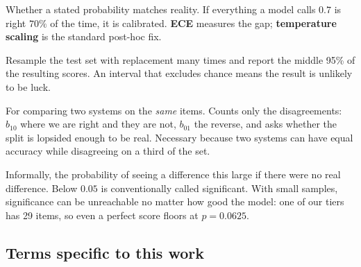 \begin{description}[leftmargin=0em,style=nextline,itemsep=0.3em]
\item[Calibration] Whether a stated probability matches reality. If
everything a model calls $0.7$ is right $70\%$ of the time, it is
calibrated. \textbf{ECE} measures the gap; \textbf{temperature scaling} is
the standard post-hoc fix.

\item[Bootstrap confidence interval] Resample the test set with
replacement many times and report the middle 95\% of the resulting scores.
An interval that excludes chance means the result is unlikely to be luck.

\item[McNemar test] For comparing two systems on the \emph{same} items.
Counts only the disagreements: $b_{10}$ where we are right and they are
not, $b_{01}$ the reverse, and asks whether the split is lopsided enough
to be real. Necessary because two systems can have equal accuracy while
disagreeing on a third of the set.

\item[$p$-value] Informally, the probability of seeing a difference this
large if there were no real difference. Below $0.05$ is conventionally
called significant. With small samples, significance can be unreachable
no matter how good the model: one of our tiers has 29 items, so even a
perfect score floors at $p = 0.0625$.

\end{description}

\subsection{Terms specific to this work}

